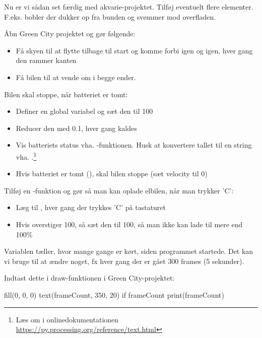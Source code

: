 \documentclass{ucph-handout}
\begin{document}
\begin{exercisebox}[adjusted title=Gør akvarieprojektet færdigt]
Nu er vi sådan set færdig med akvarie-projektet. Tilføj eventuelt
flere elementer. F.eks. bobler der dukker op fra bunden og svømmer mod
overfladen.
\end{exercisebox}
\newpage


\begin{exercisebox}[adjusted title=Flere opgaver om betingelser]
Åbn Green City projektet og gør følgende:
\begin{itemize}
\item Få skyen til at flytte tilbage til start og komme forbi igen og
  igen, hver gang den rammer kanten
\item Få bilen til at vende om i begge ender.
\end{itemize}

Bilen skal stoppe, når batteriet er tomt:
  \begin{itemize}
  \item Definer en global variabel  og sæt den til 100
  \item Reducer den med 0.1, hver gang  kaldes
  \item Vis batteriets status vha. -funktionen.
    Husk at konvertere tallet til en string vha. .\footnote{Læs om  i
      onlinedokumentationen
      \url{https://py.processing.org/reference/text.html}}
  \item Hvis batteriet er tomt (), skal bilen stoppe (sæt velocity til 0)
  \end{itemize}

\noindent
Tilføj en -funktion og gør så man kan oplade elbilen, når man trykker 'C':
\begin{itemize}
  \item Læg  til , hver gang der
    trykkes 'C' på tastaturet
  \item Hvis  overstiger 100, så sæt den til
    100, så man ikke kan lade til mere end 100\%
\end{itemize}


Variablen  tæller, hvor mange gange  er
kørt, siden programmet startede. Det kan vi bruge til at ændre noget, fx
hver gang der er gået 300 frames (5 sekunder).

\noindent
Indtast dette i draw-funktionen i Green City-projektet:
\begin{python}
fill(0, 0, 0)
text(frameCount, 350, 20)
if frameCount %
    print(frameCount)
\end{python}


\end{exercisebox}
\end{document}
